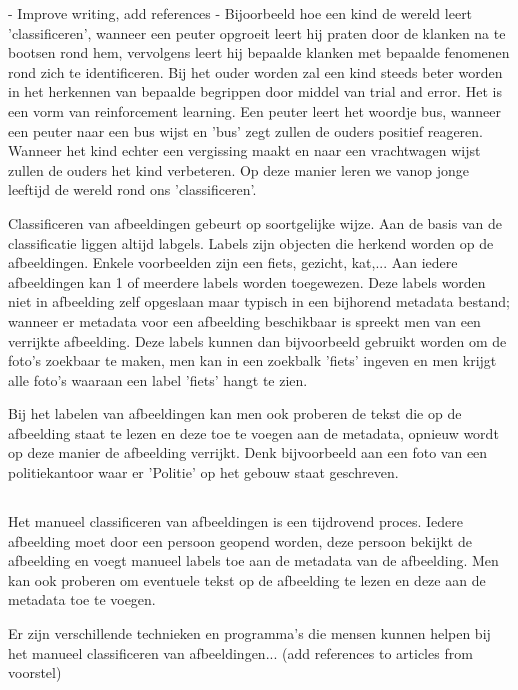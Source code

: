 - Improve writing, add references -
Bijoorbeeld hoe een kind de wereld leert 'classificeren', wanneer een peuter opgroeit leert hij praten door de klanken na te bootsen rond hem, vervolgens leert hij bepaalde klanken met bepaalde fenomenen rond zich te identificeren. Bij het ouder worden zal een kind steeds beter worden in het herkennen van bepaalde begrippen door middel van trial and error. Het is een vorm van reinforcement learning. Een peuter leert het woordje bus, wanneer een peuter naar een bus wijst en 'bus' zegt zullen de ouders positief reageren. Wanneer het kind echter een vergissing maakt en naar een vrachtwagen wijst zullen de ouders het kind verbeteren. Op deze manier leren we vanop jonge leeftijd de wereld rond ons 'classificeren'.

Classificeren van afbeeldingen gebeurt op soortgelijke wijze. Aan de basis van de classificatie liggen altijd labgels. Labels zijn objecten die herkend worden op de afbeeldingen. Enkele voorbeelden zijn een fiets, gezicht, kat,... Aan iedere afbeeldingen kan 1 of meerdere labels worden toegewezen. Deze labels worden niet in afbeelding zelf opgeslaan maar typisch in een bijhorend metadata bestand; wanneer er metadata voor een afbeelding beschikbaar is spreekt men van een verrijkte afbeelding. Deze labels kunnen dan bijvoorbeeld gebruikt worden om de foto's zoekbaar te maken, men kan in een zoekbalk 'fiets' ingeven en men krijgt alle foto's waaraan een label 'fiets' hangt te zien.

Bij het labelen van afbeeldingen kan men ook proberen de tekst die op de afbeelding staat te lezen en deze toe te voegen aan de metadata, opnieuw wordt op deze manier de afbeelding verrijkt. Denk bijvoorbeeld aan een foto van een politiekantoor waar er 'Politie' op het gebouw staat geschreven.

\subsection{}
\label{sec:manuele-classificatie}
Het manueel classificeren van afbeeldingen is een tijdrovend proces. Iedere afbeelding moet door een persoon geopend worden, deze persoon bekijkt de afbeelding en voegt manueel labels toe aan de metadata van de afbeelding. Men kan ook proberen om eventuele tekst op de afbeelding te lezen en deze aan de metadata toe te voegen.

Er zijn verschillende technieken en programma's die mensen kunnen helpen bij het manueel classificeren van afbeeldingen... (add references to articles from voorstel)

